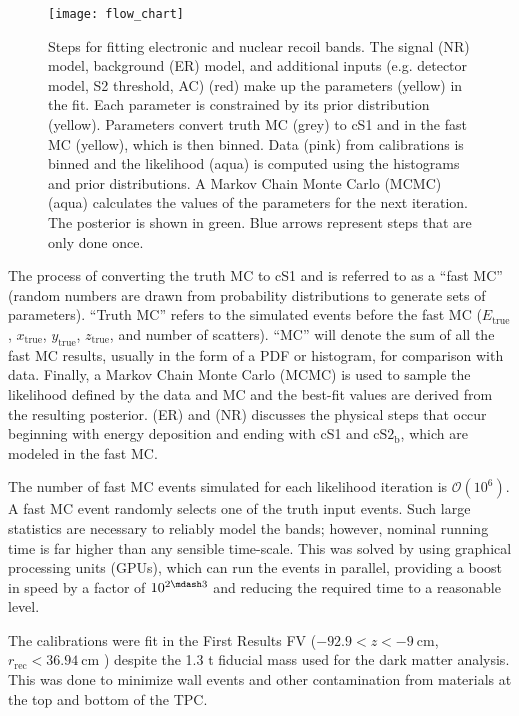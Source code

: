 \begin{figure}
\centering
\texttt{[image: flow\_chart]}
\caption{Steps for fitting electronic and nuclear recoil bands.  The signal (NR) model, background (ER) model, and additional inputs (e.g.
detector model, S2 threshold, AC) (red) make up the parameters (yellow) in the fit.  Each parameter is constrained by its
prior distribution (yellow).  Parameters convert truth MC (grey) to cS1 and \cstwob in the fast MC (yellow), which is then binned.  Data
(pink) from calibrations is binned
and the likelihood (aqua) is computed using the histograms and prior distributions.  A Markov Chain Monte Carlo (MCMC) (aqua)
calculates the values of the parameters for the next iteration.  The posterior is shown in green.  Blue arrows represent steps that are
only done once.}
\label{fig:er_nr_calibrations_parameter_determ_flow_chart}
\end{figure}

The process of converting the truth MC to cS1 and \cstwob is referred to as a ``fast MC'' (random numbers are drawn from probability
distributions to generate sets of parameters).  ``Truth MC'' refers to the simulated events before the fast MC ($E_{\mathrm{true}}$,
$x_{\mathrm{true}}$, $y_{\mathrm{true}}$, $z_{\mathrm{true}}$, and number
of scatters).  ``MC'' will denote the sum of all the fast MC results, usually in the form of a PDF or histogram, for
comparison with data.  Finally, a Markov Chain Monte Carlo (MCMC) is used to sample the likelihood defined by the data and MC and the
best-fit values
are derived from the resulting posterior.   (ER) and
 (NR) discusses the physical steps that occur beginning with energy
deposition and ending with cS1 and $\mathrm{cS2_b}$, which are modeled in the fast MC.

The number of fast MC events simulated for each likelihood iteration is $\mathcal{O}(10^6)$.  A fast MC event randomly selects one of the
truth input events.  Such large statistics are necessary to reliably model the bands;
however, nominal running time is far higher than any sensible time-scale.  This was solved by using graphical processing units (GPUs),
which can run the events in parallel, providing a boost in speed by a factor of $10^{2 \mdash 3}$ and reducing the required time to a
reasonable level.

The calibrations were fit in the First Results FV ($-92.9 < z < -9\ \mathrm{cm}$, $r_{\mathrm{rec}} < 36.94\ \mathrm{cm}$
) despite the 1.3 t fiducial mass used for the dark matter analysis.  This was done to
minimize wall events and other contamination from materials at the top and bottom of the TPC.



